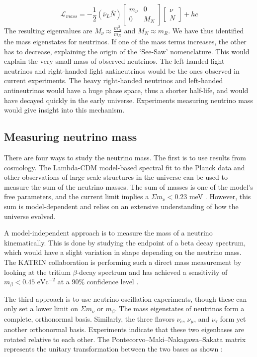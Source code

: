 \begin{equation}\label{mass_lagrangian_reduced}
\mathcal{L}_{mass} = -\frac{1}{2}(\bar{\nu}_L\bar{N}) \begin{bmatrix} m_\nu & 0 \\ 0 & M_N \end{bmatrix} \begin{bmatrix} \nu \\ N \end{bmatrix} + hc
\end{equation}
\noindent
The resulting eigenvalues are $M_\nu \approx \frac{m^2_D}{m_R}$ and $M_N \approx m_R$. We have thus identified the mass eigenstates for neutrinos. If one of the mass terms increases, the other has to decrease, explaining the origin of the `See-Saw' nomenclature. This would explain the very small mass of observed neutrinos. The left-handed light neutrinos and right-handed light antineutrinos would be the ones observed in current experiments. The heavy right-handed neutrinos and left-handed antineutrinos would have a huge phase space, thus a shorter half-life, and would have decayed quickly in the early universe. Experiments measuring neutrino mass would give insight into this mechanism. 

\subsection{Measuring neutrino mass}
There are four ways to study the neutrino mass. The first is to use results from cosmology. The Lambda-CDM model-based spectral fit to the Planck data and other observations of large-scale structures in the universe can be used to measure the sum of the neutrino masses. The sum of masses is one of the model's free parameters, and the current limit implies a $\Sigma m_\nu<0.23$ meV \cite{Planck_2015fie}. However, this sum is model-dependent and relies on an extensive understanding of how the universe evolved. 

A model-independent approach is to measure the mass of a neutrino kinematically. This is done by studying the endpoint of a beta decay spectrum, which would have a slight variation in shape depending on the neutrino mass. The KATRIN collaboration is performing such a direct mass measurement by looking at the tritium $\beta$-decay spectrum and has achieved a sensitivity of $m_\beta < 0.45 \text{ eVc}^{-2}$ at a $90\%$ confidence level \cite{katrin2025}.


The third approach is to use neutrino oscillation experiments, though these can only set a lower limit on $\Sigma m_\nu$ or $m_\beta$. The mass eigenstates of neutrinos form a complete, orthonormal basis. Similarly, the three flavors $\nu_e$, $\nu_\mu$, and $\nu_\tau$ form yet another orthonormal basis. Experiments indicate that these two eigenbases are rotated relative to each other. The Pontecorvo–Maki–Nakagawa–Sakata matrix represents the unitary transformation between the two bases as shown \cite{Maki_1962mu}:

